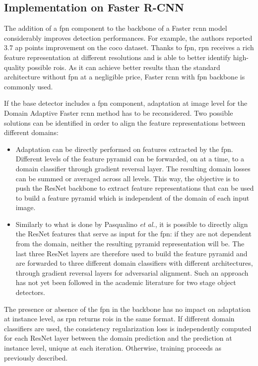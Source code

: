 \documentclass[%
    corpo=12pt,
    twoside,
    stile=classica,   
    tipotesi=magistrale,
    evenboxes,
    english,
	numerazioneromana,
]{toptesi}
\begin{document}
\subsection{Implementation on Faster R-CNN}
The addition of a \gls{fpn} component to the backbone of a Faster \gls{rcnn} model considerably improves detection performances. For example, the authors reported 3.7 \gls{ap} points improvement on the \gls{coco} dataset\cite{lin2017feature}. Thanks to \gls{fpn}, \gls{rpn} receives a rich feature representation at different resolutions and is able to better identify high-quality possible \glspl{roi}. As it can achieve better results than the standard architecture without \gls{fpn} at a negligible price, Faster \gls{rcnn} with \gls{fpn} backbone is commonly used. 

\bigskip
If the base detector includes a \gls{fpn} component, adaptation at image level for the Domain Adaptive Faster \gls{rcnn} method has to be reconsidered. Two possible solutions can be identified in order to align the feature representations between different domains:
\begin{itemize}
	\item Adaptation can be directly performed on features extracted by the \gls{fpn}. Different levels of the feature pyramid can be forwarded, on at a time, to a domain classifier through gradient reversal layer. The resulting domain losses can be summed or averaged across all levels. This way, the objective is to push the ResNet backbone to extract feature representations that can be used to build a feature pyramid which is independent of the domain of each input image.
	\item Similarly to what is done by Pasqualino \textit{et al.}\cite{pasqualino2020unsupervised}, it is possible to directly align the ResNet features that serve as input for the \gls{fpn}: if they are not dependent from the domain, neither the resulting pyramid representation will be. The last three ResNet layers are therefore used to build the feature pyramid and are forwarded to three different domain classifiers with different architectures, through gradient reversal layers for adversarial alignment. Such an approach has not yet been followed in the academic literature for two stage object detectors.
\end{itemize}
The presence or absence of the \gls{fpn} in the backbone has no impact on adaptation at instance level, as \gls{rpn} returns \glspl{roi} in the same format. If different domain classifiers are used, the consistency regularization loss is independently computed for each ResNet layer between the domain prediction and the prediction at instance level, unique at each iteration. Otherwise, training proceeds as previously described.
\end{document}
